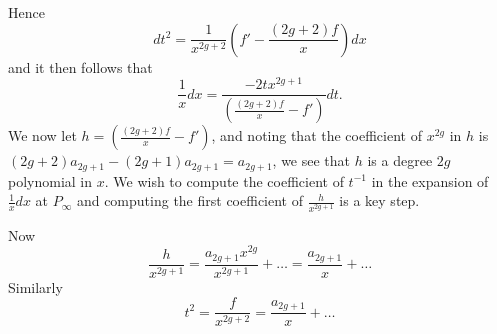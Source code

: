 \documentclass[draft, 11pt]{article} %
\theoremstyle{plain}
\theoremstyle{remark}
\begin{document}
\begin{comment}
Hence we can easily derive $c_6 = \frac{2\cdot a_{2g-1} \cdot a_{2g+1} - 2a_{2g}^2}{a_{2g+1}^4}$.


We then suppose that $\frac{1}{h}  = \sum_{i\geq -4} d_it^i$, and then we have $\sum c_it^i \cdot \sum d_it^i = 1$.
As described earlier we want to compute $d_{-2}$.
Expanding the product of the sums we see
\[
1 = c_4\cdot d_{-4} + (c_6\cdot d_{-4} + c_4\cdot d_{-2})t^2 + \ldots
\]
So $c_4 \cdot d_{-4} = 1$ and hence $d_{-4} = \frac{1}{c_4}$.



Then we also have $c_6d_{-4} + c_4d_{-2} = 0$ and hence $d_{-2} = -\frac{c_6d_{-4}}{c_4} = -\frac{c_6}{c_4}$.
So in total  
\[
d_{-2} = \frac{a_{2g+1}^4}{a_{2g}^2} \cdot \left( \frac{2a_{2g-1}a_{2g+1} - 2a_{2g}^2}{a_{2g+1}^4} \right) = \frac{2a_{2g-1}a_{2g+1} - 2a_{2g}^2}{a_{2g}^2}.
\]

Now we can assume that $a_{2g+1} = 1$, since this will not affect the curve.
This reduces the task of showing that the residue is non-zero to showing that $a_{2g-1} -a_{2g}^2 \neq 0$.
But if we write the roots of $f(x)$ as $\alpha_i \in k$ with $1\leq i \leq 2g+1$ then we can see that $a_{2g-1} -a_{2g}^2 = \sum_{i=1}^{2g+1}\alpha_i^2$.
 
{\bf If this sum is zero, then by an automorphism of the curve we can change one of the roots by a small value, and hence make it non-zero. 
Indeed, we can fix all but one root, say $\alpha_1$. Then there is only one value of $\alpha_1$ such that $a_{2g}=0$, and there are only two values of $\alpha_1$ such that $\sum_{i=1}^{2g+1}\alpha_i^2 = 0$. Since $k$ is infinite we can certainly ensure that our automorphism of $X$ sends $\alpha_1$ to an element of $k$ distinct from these three values.}
\end{comment}

Hence
\[
dt^2 = \frac{1}{x^{2g+2}}\left(f' - \frac{(2g+2)f}{x}\right) dx
\]
and it then follows that
\[
\frac{1}{x}dx = \frac{-2tx^{2g+1}}{\left(\frac{(2g+2)f}{x} - f'\right)} dt.
\]
We now let $h = \left(\frac{(2g+2)f}{x} - f'\right)$, and noting that the coefficient of $x^{2g}$ in $h$ is $(2g+2)a_{2g+1} - (2g+1)a_{2g+1} = a_{2g+1}$, we see that $h$ is a degree $2g$ polynomial in $x$.
We wish to compute the coefficient of $t^{-1}$ in the expansion of $\frac{1}{x}dx$ at $P_\infty$ and computing the first coefficient of $\frac{h}{x^{2g+1}}$ is a key step.

Now
\[
\frac{h}{x^{2g+1}} = \frac{a_{2g+1}x^{2g}}{x^{2g+1}} + \ldots = \frac{a_{2g+1}}{x} + \ldots 
\]
Similarly 
\[
t^2 = \frac{f}{x^{2g+2} } = \frac{a_{2g+1}}{x} + \ldots
\]
\end{document}

